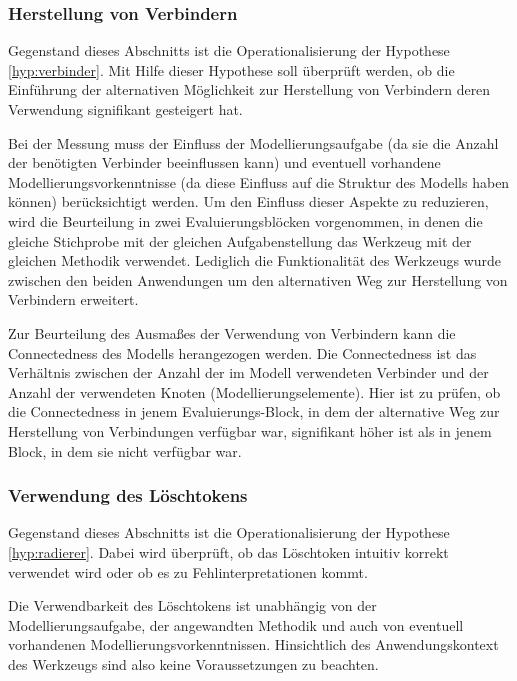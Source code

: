\subsubsection{Herstellung von Verbindern} %
\label{ssub:herstellung_von_verbindern}

Gegenstand dieses Abschnitts ist die Operationalisierung der Hypothese \ref{hyp:verbinder}. Mit Hilfe dieser Hypothese soll überprüft werden, ob die Einführung der alternativen Möglichkeit zur Herstellung von Verbindern deren Verwendung signifikant gesteigert hat.

Bei der Messung muss der Einfluss der Modellierungsaufgabe (da sie die Anzahl der benötigten Verbinder beeinflussen kann) und eventuell vorhandene Modellierungsvorkenntnisse (da diese Einfluss auf die Struktur des Modells haben können) berücksichtigt werden. Um den Einfluss dieser Aspekte zu reduzieren, wird die Beurteilung in zwei Evaluierungsblöcken vorgenommen, in denen die gleiche Stichprobe mit der gleichen Aufgabenstellung das Werkzeug mit der gleichen Methodik verwendet. Lediglich die Funktionalität des Werkzeugs wurde zwischen den beiden Anwendungen um den alternativen Weg zur Herstellung von Verbindern erweitert.  

Zur Beurteilung des Ausmaßes der Verwendung von Verbindern kann die Connectedness des Modells herangezogen werden. Die Connectedness ist das Verhältnis zwischen der Anzahl der im Modell verwendeten Verbinder und der Anzahl der verwendeten Knoten (Modellierungselemente). Hier ist zu prüfen, ob die Connectedness in jenem Evaluierungs-Block, in dem der alternative Weg zur Herstellung von Verbindungen verfügbar war, signifikant höher ist als in jenem Block, in dem sie nicht verfügbar war.


\subsubsection{Verwendung des Löschtokens} %
\label{ssub:löschtoken}

Gegenstand dieses Abschnitts ist die Operationalisierung der Hypothese \ref{hyp:radierer}. Dabei wird überprüft, ob das Löschtoken intuitiv korrekt verwendet wird oder ob es zu Fehlinterpretationen kommt.

Die Verwendbarkeit des Löschtokens ist unabhängig von der Modellierungsaufgabe, der angewandten Methodik und auch von eventuell vorhandenen Modellierungsvorkenntnissen. Hinsichtlich des Anwendungskontext des Werkzeugs sind also keine Voraussetzungen zu beachten.

